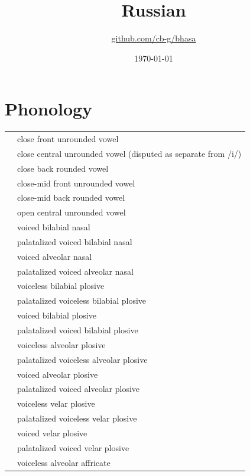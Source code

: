 \documentclass{article}
\title{Russian\\\ipa{["rusk\super jij j@"zik]}}
\author{\href{https://github.com/cb-g/bhasa}{github.com/cb-g/bhasa}}
\date{\today}
\begin{document}
\pagecolor{custom_bg}\color{custom_fg}
\maketitle\thispagestyle{empty}

\newpage\setcounter{page}{1}\section{Phonology}

\begin{xltabular}{\textwidth}{lL}
   & close front unrounded vowel \\
   & close central unrounded vowel (disputed as separate from /i/) \\
   & close back rounded vowel \\
   & close-mid front unrounded vowel \\
   & close-mid back rounded vowel \\
   & open central unrounded vowel \\
   & voiced bilabial nasal \\
   & palatalized voiced bilabial nasal \\
   & voiced alveolar nasal \\
   & palatalized voiced alveolar nasal \\
   & voiceless bilabial plosive \\
   & palatalized voiceless bilabial plosive \\
   & voiced bilabial plosive \\
   & palatalized voiced bilabial plosive \\
   & voiceless alveolar plosive \\
   & palatalized voiceless alveolar plosive \\
   & voiced alveolar plosive \\
   & palatalized voiced alveolar plosive \\
   & voiceless velar plosive \\
   & palatalized voiceless velar plosive \\
   & voiced velar plosive \\
   & palatalized voiced velar plosive \\
   & voiceless alveolar affricate \\

\end{xltabular}
\end{document}
